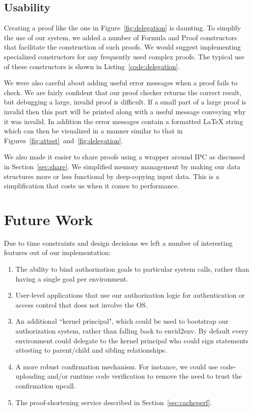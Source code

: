 \documentclass[10pt]{article}
\begin{document}
\subsection{Usability}
Creating a proof like the one in Figure~\ref{fig:delegation} is daunting.  To simplify the use of our system, we added a number of Formula and Proof constructors that facilitate the construction of such proofs.  We would suggest implementing specialized constructors for any frequently used complex proofs.  The typical use of these constructors is shown in Listing~\ref{code:delegation}.

We were also careful about adding useful error messages when a proof fails to check.  We are fairly confident that our proof checker returns the correct result, but debugging a large, invalid proof is difficult.  If a small part of a large proof is invalid then this part will be printed along with a useful message conveying why it was invalid.  In addition the error messages contain a formatted \LaTeX{ }string which can then be visualized in a manner similar to that in Figures~\ref{fig:attest}~and~\ref{fig:delegation}.

We also made it easier to share proofs using a wrapper around IPC as discussed in Section~\ref{sec:share}.  We simplified memory management by making our data structures more or less functional by deep-copying input data.  This is a simplification that costs us when it comes to performance.

\section{Future Work}
Due to time constraints and design decisions we left a number of interesting features out of our implementation:
\begin{enumerate}
\item The ability to bind authorization goals to particular system calls, rather than having a single goal per environment.
\item User-level applications that use our authorization logic for authentication or access control that does not involve the OS.
\item An additional ``kernel principal", which could be used to bootstrap our authorization system, rather than falling back to \textsf{envid2env}. By default every environment could delegate to the kernel principal who could sign statements attesting to parent/child and sibling relationships.
\item A more robust confirmation mechanism. For instance, we could use code-uploading and/or runtime code verification to remove the need to trust the confirmation upcall.
\item The proof-shortening service described in Section~\ref{sec:cacheperf}.
\end{enumerate}
\end{document}
